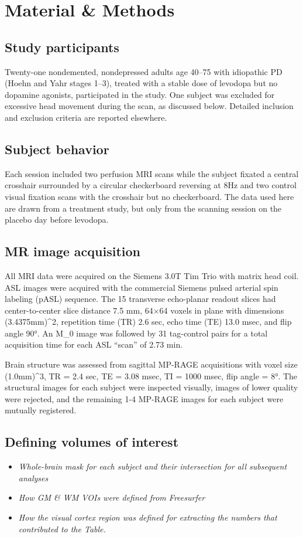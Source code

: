\section{Material \& Methods}

\subsection{Study participants}
Twenty-one nondemented, nondepressed adults age 40–75 with idiopathic PD (Hoehn and Yahr stages 1–3),\cite{6067254} treated with a stable dose of levodopa but no dopamine agonists, participated in the study. One subject was excluded for excessive head movement during the scan, as discussed below. Detailed inclusion and exclusion criteria are reported elsewhere.\cite{Black_2010}

\subsection{Subject behavior}
Each session included two perfusion MRI scans while the subject fixated a central crosshair surrounded by a circular checkerboard reversing at 8Hz and two control visual fixation scans with the crosshair but no checkerboard. The data used here are drawn from a treatment study,\cite{Black_2010} but only from the scanning session on the placebo day before levodopa. 

\subsection{MR image acquisition}
All MRI data were acquired on the Siemens 3.0T Tim Trio with matrix head coil. ASL images were acquired with the commercial Siemens pulsed arterial spin labeling (pASL) sequence.\cite{Wang_2003} The 15 transverse echo-planar readout slices had center-to-center slice distance 7.5 mm, 64×64 voxels in plane with dimensions (3.4375mm)^2, repetition time (TR) 2.6 sec, echo time (TE) 13.0 msec, and flip angle 90°. An M_0 image was followed by 31 tag-control pairs for a total acquisition time for each ASL ``scan'' of 2.73 min.

Brain structure was assessed from sagittal MP-RAGE acquisitions with voxel size (1.0mm)^3, TR = 2.4 sec, TE = 3.08 msec, TI = 1000 msec, flip angle = 8°. The structural images for each subject were inspected visually, images of lower quality were rejected, and the remaining 1-4 MP-RAGE images for each subject were mutually registered.

\subsection{Defining volumes of interest}
\begin{itemize}
\item \textit{Whole-brain mask for each subject and their intersection for all subsequent analyses}
\item \textit{How GM & WM VOIs were defined from Freesurfer}
\item \textit{How the visual cortex region was defined for extracting the numbers that contributed to the Table.}
\end{itemize}

